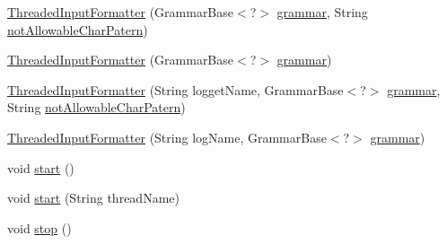 \begin{DoxyCompactItemize}
\item 
\hyperlink{classit_1_1emarolab_1_1cagg_1_1core_1_1evaluation_1_1inputFormatting_1_1ThreadedInputFormatter_af9bc8565a56003ff6281e595af71da73}{Threaded\-Input\-Formatter} (Grammar\-Base$<$?$>$ \hyperlink{classit_1_1emarolab_1_1cagg_1_1core_1_1evaluation_1_1inputFormatting_1_1InputFormatterBase_a3de6c039296a18f821706f1b8e0cb2a5}{grammar}, String \hyperlink{classit_1_1emarolab_1_1cagg_1_1core_1_1evaluation_1_1inputFormatting_1_1InputFormatterBase_af8c1c79313632272c67711704784ef13}{not\-Allowable\-Char\-Patern})
\item 
\hyperlink{classit_1_1emarolab_1_1cagg_1_1core_1_1evaluation_1_1inputFormatting_1_1ThreadedInputFormatter_aa2ac03f65db6d73981dec4d135e6f03c}{Threaded\-Input\-Formatter} (Grammar\-Base$<$?$>$ \hyperlink{classit_1_1emarolab_1_1cagg_1_1core_1_1evaluation_1_1inputFormatting_1_1InputFormatterBase_a3de6c039296a18f821706f1b8e0cb2a5}{grammar})
\item 
\hyperlink{classit_1_1emarolab_1_1cagg_1_1core_1_1evaluation_1_1inputFormatting_1_1ThreadedInputFormatter_a7ce30fa45027757ccbbdcc04b588ff2b}{Threaded\-Input\-Formatter} (String logget\-Name, Grammar\-Base$<$?$>$ \hyperlink{classit_1_1emarolab_1_1cagg_1_1core_1_1evaluation_1_1inputFormatting_1_1InputFormatterBase_a3de6c039296a18f821706f1b8e0cb2a5}{grammar}, String \hyperlink{classit_1_1emarolab_1_1cagg_1_1core_1_1evaluation_1_1inputFormatting_1_1InputFormatterBase_af8c1c79313632272c67711704784ef13}{not\-Allowable\-Char\-Patern})
\item 
\hyperlink{classit_1_1emarolab_1_1cagg_1_1core_1_1evaluation_1_1inputFormatting_1_1ThreadedInputFormatter_a7ef6c3ffbcb540f331468a57c05235f4}{Threaded\-Input\-Formatter} (String log\-Name, Grammar\-Base$<$?$>$ \hyperlink{classit_1_1emarolab_1_1cagg_1_1core_1_1evaluation_1_1inputFormatting_1_1InputFormatterBase_a3de6c039296a18f821706f1b8e0cb2a5}{grammar})
\item 
void \hyperlink{classit_1_1emarolab_1_1cagg_1_1core_1_1evaluation_1_1inputFormatting_1_1ThreadedInputFormatter_a03a13b642a2599830c2e507eb5448afe}{start} ()
\item 
void \hyperlink{classit_1_1emarolab_1_1cagg_1_1core_1_1evaluation_1_1inputFormatting_1_1ThreadedInputFormatter_ad1c5c2b57ece9f4d4d476930c41cebb7}{start} (String thread\-Name)
\item 
void \hyperlink{classit_1_1emarolab_1_1cagg_1_1core_1_1evaluation_1_1inputFormatting_1_1ThreadedInputFormatter_ac0dea2967bd610a6a3ec7d57bf809b50}{stop} ()

\end{DoxyCompactItemize}
